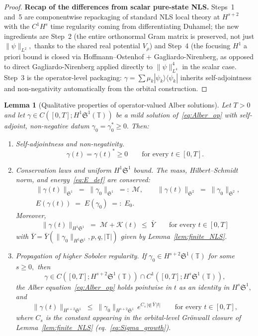 \documentclass[11pt]{amsart}
\newtheorem{lemma}[theorem]{Lemma}
\theoremstyle{definition}
\newcommand{\T}{\mathbb{T}}
\newcommand{\Sp}{\mathfrak{S}}
\begin{document}
\begin{proof}
\smallskip

\noindent\textbf{Recap of the differences from scalar pure-state NLS.} Steps~1 and~5 are componentwise repackaging of standard NLS local theory at $H^{s+2}$ with the $C^1H^s$ time regularity coming from differentiating Duhamel; the new ingredients are Step~2 (the entire orthonormal Gram matrix is preserved, not just $\|\psi\|_{L^2},$ thanks to the shared real potential $V_\rho$) and Step~4 (the focusing $H^1$ a priori bound is closed via Hoffmann--Ostenhof + Gagliardo-Nirenberg, as opposed to direct Gagliardo-Nirenberg applied directly to $\|\psi\|_{L^4}^4$ in the scalar case. Step~3 is the operator-level packaging: $\gamma=\sum\mu_k|\psi_k\rangle\langle\psi_k|$ inherits self-adjointness and non-negativity automatically from the orbital construction.
\end{proof}

\begin{lemma}[Qualitative properties of operator-valued Alber solutions]
\label{lem:finite_system}
Let $T>0$ and let $\gamma\in C([0,T];H^1\Sp^1(\T))$ be a mild solution of~\eqref{eq:Alber_op} with self-adjoint, non-negative datum $\gamma_0=\gamma_0^*\ge 0.$ Then:
\begin{enumerate}
\item[(a)] \emph{Self-adjointness and non-negativity.}
\[
  \gamma(t)=\gamma(t)^{*}\ge 0\qquad\text{for every }t\in[0,T].
\]
\item[(b)] \emph{Conservation laws and uniform $H^1\Sp^1$ bound.} The mass, Hilbert--Schmidt norm, and energy~\eqref{eq:E_def} are conserved:
\begin{equation}\label{eq:lfs_conservation}
\begin{aligned}
  &\|\gamma(t)\|_{\Sp^1}\;=\;\|\gamma_0\|_{\Sp^1}\;=:\;\mathcal{M},
  \qquad
  \|\gamma(t)\|_{\Sp^2}\;=\;\|\gamma_0\|_{\Sp^2},\\
  &E(\gamma(t))\;=\;E(\gamma_0)\;=:\;E_0.
\end{aligned}
\end{equation}
Moreover, 
\begin{equation}\label{eq:lfs_apriori}
  \|\gamma(t)\|_{H^1\Sp^1}\;=\;\mathcal{M}+\mathcal{K}(t)\;\le\;\bar Y\qquad\text{for every }t\in[0,T]
\end{equation}
with $\bar Y=\bar Y(\|\gamma_0\|_{H^1\Sp^1},p,q,|\T|)$ given by Lemma~\ref{lem:finite_NLS}.
\item[(c)] \emph{Propagation of higher Sobolev regularity.} If $\gamma_0\in H^{s+2}\Sp^1(\T)$ for some $s\ge 0,$ then
\[
  \gamma\in C([0,T];H^{s+2}\Sp^1(\T))\cap C^1([0,T];H^s\Sp^1(\T)),
\]
the Alber equation~\eqref{eq:Alber_op} holds pointwise in $t$ as an identity in $H^s\Sp^1,$ and
\begin{equation}\label{eq:lfs_Hs_bound}
  \|\gamma(t)\|_{H^{s+2}\Sp^1}\;\le\;\|\gamma_0\|_{H^{s+2}\Sp^1}\,e^{C_s\,|q|\,\bar Y\,|t|}
  \qquad\text{for every }t\in[0,T],
\end{equation}
where $C_s$ is the constant appearing in the orbital-level Gr\"onwall closure of Lemma~\ref{lem:finite_NLS} (eq.~\eqref{eq:Sigma_growth}).
\end{enumerate}
\end{lemma}
\end{document}
